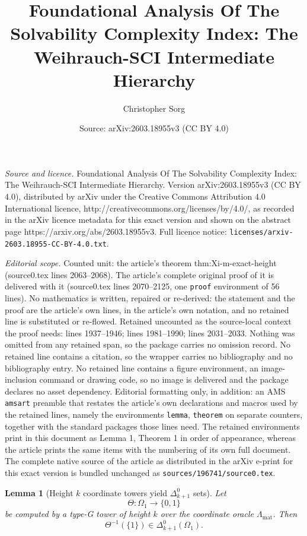 \documentclass[10pt,a4paper]{amsart}
\title{Foundational Analysis Of The Solvability Complexity Index: The Weihrauch-SCI Intermediate Hierarchy}
\author{Christopher Sorg}
\date{Source: arXiv:2603.18955v3 (CC BY 4.0)}
\newtheorem{lemma}{Lemma}
\begin{document}
\maketitle

\noindent\emph{Source and licence.} Foundational Analysis Of The Solvability Complexity Index: The Weihrauch-SCI Intermediate Hierarchy. Version arXiv:2603.18955v3 (CC BY 4.0), distributed by arXiv under the Creative Commons Attribution 4.0 International licence, http://creativecommons.org/licenses/by/4.0/, as recorded in the arXiv licence metadata for this exact version and shown on the abstract page https://arxiv.org/abs/2603.18955v3. Full licence notice: \texttt{licenses/arxiv-2603.18955-CC-BY-4.0.txt}.\par\smallskip

\noindent\textit{Editorial scope.} Counted unit: the article's theorem thm:Xi-m-exact-height (source0.tex lines 2063--2068). The article's complete original proof of it is delivered with it (source0.tex lines 2070--2125, one \texttt{proof} environment of 56 lines). No mathematics is written, repaired or re-derived: the statement and the proof are the article's own lines, in the article's own notation, and no retained line is substituted or re-flowed.  Retained uncounted as the source-local context the proof needs: lines 1937--1946; lines 1981--1990; lines 2031--2033.  Nothing was omitted from any retained span, so the package carries no omission record.  No retained line contains a citation, so the wrapper carries no bibliography and no bibliography entry.  No retained line contains a figure environment, an image-inclusion command or drawing code, so no image is delivered and the package declares no asset dependency.  Editorial formatting only, in addition: an AMS \texttt{amsart} preamble that restates the article's own declarations and macros used by the retained lines, namely the environments \texttt{lemma}, \texttt{theorem} on separate counters, together with the standard packages those lines need.  The retained environments print in this document as Lemma 1, Theorem 1 in order of appearance, whereas the article prints the same items with the numbering of its own full document.  The complete native source of the article as distributed in the arXiv e-print for this exact version is bundled unchanged as \texttt{sources/196741/source0.tex}.
\begin{lemma}[Height \(k\) coordinate towers yield \(\Delta^0_{k+1}\) sets]\label{lem:height-k-delta}
Let
\[
\Theta:\Omega_1\to\{0,1\}
\]
be computed by a type-G tower of height \(k\) over the coordinate oracle \(\Lambda_{\mathrm{mat}}\). Then
\[
\Theta^{-1}(\{1\})\in\Delta^0_{k+1}(\Omega_1).
\]
\end{lemma}
\end{document}
